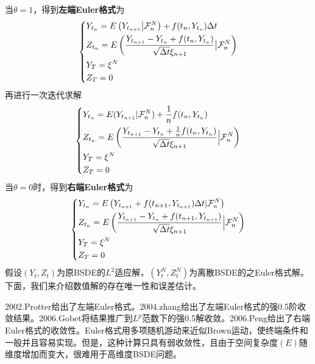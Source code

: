 			当$\theta=1$，得到\textbf{左端Euler格式}为
					\begin{equation*}
					\centering
					\left\{\begin{lgathered}
					Y_{t_n} = E\left( Y_{t_{n + 1}}\bigl|\mathcal{F}_n^N  \right) + f( t_n,Y_{t_n} )\Delta t\\
					Z_{t_n} = E\left( \frac{Y_{t_{n + 1}} - Y_{t_n} + f( t_n,Y_{t_n} )}{\sqrt {\Delta t} \xi _{n + 1}}\bigl| \mathcal{F}_n^N  \right)\\
					Y_T = \xi ^N\\
					Z_T = 0
					\end{lgathered} \right.
					\end{equation*}
			再进行一次迭代求解
					\begin{equation*}
					\centering
					\left\{\begin{lgathered}
					Y_{t_n} = E( Y_{t_{n + 1}}| \mathcal{F}_n^N ) + \frac{1}{n}f( t_n,Y_{t_n} )\\
					Z_{t_n} = E\left( \frac{Y_{t_{n + 1}} - Y_{t_n} + \frac{1}{n}f( t_n,Y_{t_n} )}{\sqrt {\Delta t} \xi _{n + 1}}\Bigl| \mathcal{F}_n^N  \right)\\
					Y_T = \xi ^N\\
					Z_T = 0
					\end{lgathered} \right.
					\end{equation*}
			 当$\theta=0$时，得到\textbf{右端Euler格式}为
					\begin{equation*}
						\centering
					\left\{\begin{lgathered}
					Y_{t_n} = E\left( Y_{t_{n + 1}} + f( t_{n + 1},Y_{t_{n + 1}} )\Delta t| \mathcal{F}_n^N \right)\\
					Z_{t_n} = E\left( \frac{Y_{t_{n + 1}} - Y_{t_n} + f( t_{n + 1},Y_{t_{n + 1}} )}{\sqrt {\Delta t} \xi_{n + 1}}\Bigl| \mathcal{F}_n^N\right)\\
					Y_T = \xi ^N\\
					Z_T = 0
					\end{lgathered} \right.
					\end{equation*}
			假设$(Y_t,Z_t)$为原BSDE的$L^2$适应解，$(Y_t^N,Z_t^N)$为离散BSDE的之Euler格式解。下面，我们来介绍数值解的存在唯一性和误差估计。
			\par
			2002.Protter\cite{2002.Protter}给出了左端Euler格式。2004.zhang\cite{2004.zhang}给出了左端Euler格式的强0.5阶收敛结果。2006.Gobet\cite{2006.Gobet}将结果推广到$L^p$范数下的强0.5解收敛。2006.Peng\cite{2006.Peng}给出了右端Euler格式的收敛性。Euler格式用多项随机游动来近似Brown运动，使终端条件和一般并且容易实现。但是，这种计算只具有弱收敛性，且由于空间复杂度$(E)$随维度增加而变大，很难用于高维度BSDE问题。

